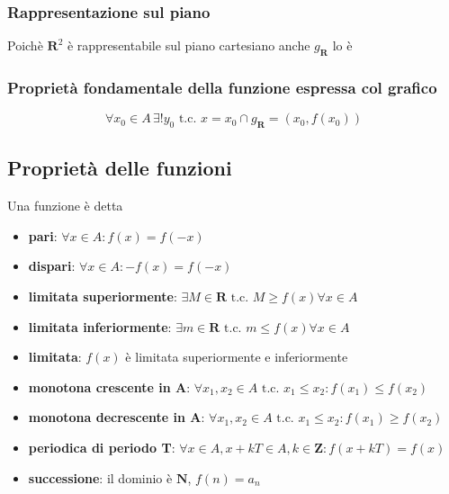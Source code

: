 \documentclass{report}
\begin{document}
        \subsubsection{Rappresentazione sul piano}
            Poichè $\mathbf{R}^2$ è rappresentabile sul piano cartesiano anche 
            $g_{\mathbf{R}}$ lo è
        \subsubsection{Proprietà fondamentale della funzione espressa col grafico}
        $$\forall x_0 \in A \, \exists!y_0 \textrm{ t.c. } {x = x_0} \cap {g_{\mathbf{R}}}
            = {(x_0, f(x_0))}$$
    \subsection{Proprietà delle funzioni}
        Una funzione è detta
        \begin{itemize}
            \item \textbf{pari}: $\forall x \in A: f(x) = f(-x)$
            \item \textbf{dispari}: $\forall x \in A: -f(x) = f(-x)$
            \item \textbf{limitata superiormente}: $\exists M \in \mathbf{R} 
                \textrm{ t.c. } M \geq f(x) \forall x \in A$
            \item \textbf{limitata inferiormente}: $\exists m \in \mathbf{R} 
                \textrm{ t.c. } m \leq f(x) \forall x \in A$
            \item \textbf{limitata}: $f(x)$ è limitata superiormente e inferiormente
            \item \textbf{monotona crescente in A}: $\forall x_1, x_2 \in A \textrm{ t.c. } 
                x_1 \leq x_2: f(x_1) \leq f(x_2)$
            \item \textbf{monotona decrescente in A}: $\forall x_1, x_2 \in A \textrm{ t.c. } 
                x_1 \leq x_2: f(x_1) \geq f(x_2)$
            \item \textbf{periodica di periodo T}: $\forall x \in A, x + kT \in A, 
                k \in \mathbf{Z}: f(x + kT) = f(x)$
            \item \textbf{successione}: il dominio è $\mathbf{N}$, $f(n) = a_n$
        \end{itemize}
\end{document}
